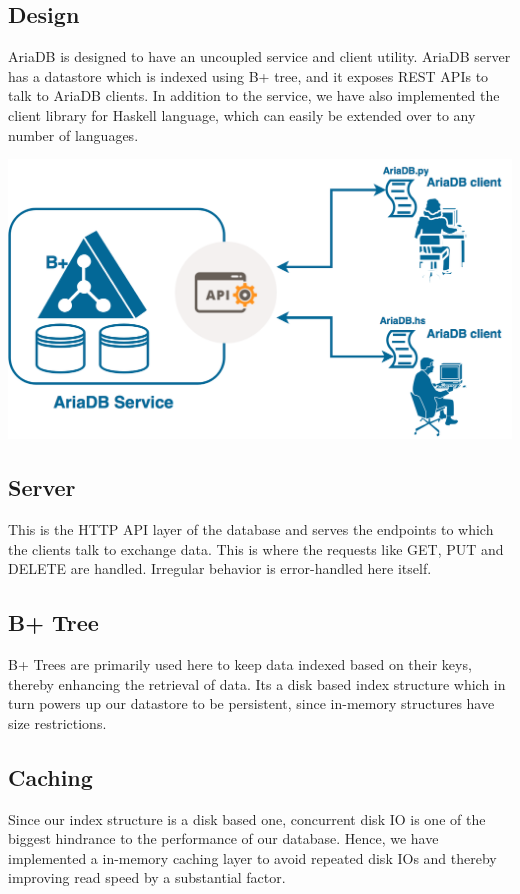 \documentclass[a0,portrait]{a0poster}
\begin{document}
\begin{multicols}{2}
\section*{Design}
AriaDB is designed to have an uncoupled service and client utility. AriaDB server has a datastore which is indexed using B+ tree, and it exposes REST APIs to talk to AriaDB clients. In addition to the service, we have also implemented the client library for Haskell language, which can easily be extended over to any number of languages.
\begin{center}\vspace{1cm}
\includegraphics[width=0.8\linewidth]{ariaDB}
\end{center}

\subsection*{Server}
This is the HTTP API layer of the database and serves the endpoints to which the clients talk  to exchange data. This is where the requests like GET, PUT and DELETE are handled. Irregular behavior is error-handled here itself.

\subsection*{B+ Tree}
B+ Trees are primarily used here to keep data indexed based on their keys, thereby enhancing the retrieval of data. Its a disk based index structure which in turn powers up our datastore to be persistent, since in-memory structures have size restrictions. 

\subsection*{Caching}
Since our index structure is a disk based one, concurrent disk IO is one of the biggest hindrance to the performance of our database. Hence, we have implemented a in-memory caching layer to avoid repeated disk IOs and thereby improving read speed by a substantial factor.


\end{multicols}
\end{document}

